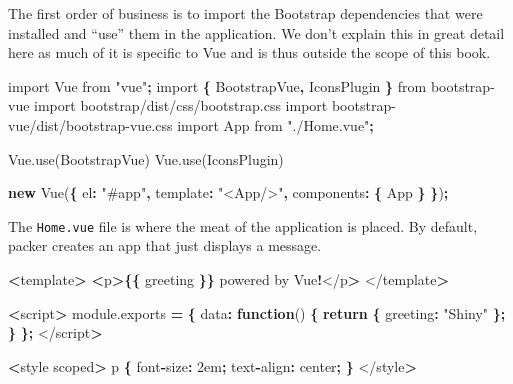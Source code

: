 \documentclass[
  10pt,
]{krantz}
\makeatletter
\newenvironment{Shaded}{\begin{snugshade}}{\end{snugshade}}
\newcommand{\AttributeTok}[1]{\textcolor[rgb]{0.61,0.61,0.61}{#1}}
\newcommand{\ControlFlowTok}[1]{\textcolor[rgb]{0.27,0.27,0.27}{\textbf{#1}}}
\newcommand{\DataTypeTok}[1]{\textcolor[rgb]{0.27,0.27,0.27}{#1}}
\newcommand{\ImportTok}[1]{#1}
\newcommand{\KeywordTok}[1]{\textcolor[rgb]{0.27,0.27,0.27}{\textbf{#1}}}
\newcommand{\NormalTok}[1]{#1}
\newcommand{\OperatorTok}[1]{\textcolor[rgb]{0.43,0.43,0.43}{\textbf{#1}}}
\newcommand{\StringTok}[1]{\textcolor[rgb]{0.5,0.5,0.5}{#1}}
\newcommand{\VariableTok}[1]{\textcolor[rgb]{0,0,0}{#1}}
\newenvironment{kframe}{%
\medskip{}
\setlength{\fboxsep}{.8em}
 \def\at@end@of@kframe{}%
 \ifinner\ifhmode%
  \def\at@end@of@kframe{\end{minipage}}%
  \begin{minipage}{\columnwidth}%
 \fi\fi%
 \def\FrameCommand##1{\hskip\@totalleftmargin \hskip-\fboxsep
 \colorbox{shadecolor}{##1}\hskip-\fboxsep
     \hskip-\linewidth \hskip-\@totalleftmargin \hskip\columnwidth}%
 \MakeFramed {\advance\hsize-\width
   \@totalleftmargin\z@ \linewidth\hsize
   \@setminipage}}%
 {\par\unskip\endMakeFramed%
 \at@end@of@kframe}
\renewenvironment{Shaded}{\begin{kframe}}{\end{kframe}}
\makeatother
\begin{document}
The first order of business is to import the Bootstrap dependencies that were installed and ``use'' them in the application. We don't explain this in great detail here as much of it is specific to Vue and is thus outside the scope of this book.

\begin{Shaded}
\begin{Highlighting}[]
\ImportTok{import}\NormalTok{ Vue }\ImportTok{from} \StringTok{"vue"}\OperatorTok{;}
\ImportTok{import} \OperatorTok{\{}\NormalTok{ BootstrapVue}\OperatorTok{,}\NormalTok{ IconsPlugin }\OperatorTok{\}} \ImportTok{from} \StringTok{\textquotesingle{}bootstrap{-}vue\textquotesingle{}}
\ImportTok{import} \StringTok{\textquotesingle{}bootstrap/dist/css/bootstrap.css\textquotesingle{}}
\ImportTok{import} \StringTok{\textquotesingle{}bootstrap{-}vue/dist/bootstrap{-}vue.css\textquotesingle{}}
\ImportTok{import}\NormalTok{ App }\ImportTok{from} \StringTok{"./Home.vue"}\OperatorTok{;}

\VariableTok{Vue}\NormalTok{.}\AttributeTok{use}\NormalTok{(BootstrapVue)}
\VariableTok{Vue}\NormalTok{.}\AttributeTok{use}\NormalTok{(IconsPlugin)}

\KeywordTok{new} \AttributeTok{Vue}\NormalTok{(}\OperatorTok{\{}
  \DataTypeTok{el}\OperatorTok{:} \StringTok{"\#app"}\OperatorTok{,}
  \DataTypeTok{template}\OperatorTok{:} \StringTok{"<App/>"}\OperatorTok{,}
  \DataTypeTok{components}\OperatorTok{:} \OperatorTok{\{}\NormalTok{ App }\OperatorTok{\}}
\OperatorTok{\}}\NormalTok{)}\OperatorTok{;}
\end{Highlighting}
\end{Shaded}

The \texttt{Home.vue} file is where the meat of the application is placed. By default, packer creates an app that just displays a message.

\begin{Shaded}
\begin{Highlighting}[]
\OperatorTok{<}\NormalTok{template}\OperatorTok{>}
  \OperatorTok{<}\NormalTok{p}\OperatorTok{>\{\{}\NormalTok{ greeting }\OperatorTok{\}\}}\NormalTok{ powered by Vue}\OperatorTok{!}\NormalTok{</p}\OperatorTok{>}
\NormalTok{</template}\OperatorTok{>}

\OperatorTok{<}\NormalTok{script}\OperatorTok{>}
\VariableTok{module}\NormalTok{.}\AttributeTok{exports} \OperatorTok{=} \OperatorTok{\{}
  \DataTypeTok{data}\OperatorTok{:} \KeywordTok{function}\NormalTok{() }\OperatorTok{\{}
    \ControlFlowTok{return} \OperatorTok{\{}
      \DataTypeTok{greeting}\OperatorTok{:} \StringTok{"Shiny"}
    \OperatorTok{\};}
  \OperatorTok{\}}
\OperatorTok{\};}
\NormalTok{</script}\OperatorTok{>}

\OperatorTok{<}\NormalTok{style scoped}\OperatorTok{>}
\NormalTok{p }\OperatorTok{\{}
\NormalTok{  font}\OperatorTok{{-}}\DataTypeTok{size}\OperatorTok{:}\NormalTok{ 2em}\OperatorTok{;}
\NormalTok{  text}\OperatorTok{{-}}\DataTypeTok{align}\OperatorTok{:}\NormalTok{ center}\OperatorTok{;}
\OperatorTok{\}}
\NormalTok{</style}\OperatorTok{>}
\end{Highlighting}
\end{Shaded}
\end{document}
